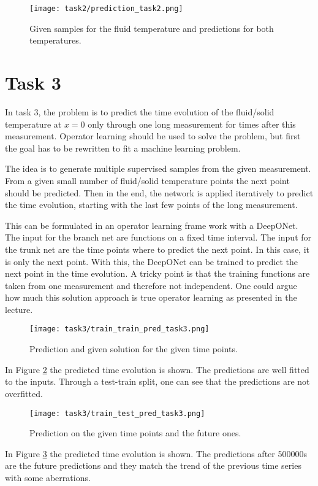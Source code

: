\documentclass{article}
\begin{document}
\begin{figure}[ht!]
\texttt{[image: task2/prediction\_task2.png]}
\caption{Given samples for the fluid temperature and predictions for both temperatures.}
\label{fig:task2_predictions}
\end{figure}

\section{Task 3}
In task 3, the problem is to predict the time evolution of the fluid/solid temperature at $x=0$
only through one long measurement for times after this measurement.
Operator learning should be used to solve the problem,
but first the goal has to be rewritten to fit a machine learning problem.

The idea is to generate multiple supervised samples from the given measurement.
From a given small number of fluid/solid temperature points the next point should be predicted.
Then in the end, the network is applied iteratively to predict the time evolution,
starting with the last few points of the long measurement.

This can be formulated in an operator learning frame work with a DeepONet.
The input for the branch net are functions on a fixed time interval.
The input for the trunk net are the time points where to predict the next point. In this case, it is only the next point.
With this, the DeepONet can be trained to predict the next point in the time evolution.
A tricky point is that the training functions are taken from one measurement
and therefore not independent. One could argue how much this solution approach is true operator learning as presented in the lecture.

\begin{figure}[ht!]
\texttt{[image: task3/train\_train\_pred\_task3.png]}
\caption{Prediction and given solution for the given time points.}
\label{fig:task4_predt}
\end{figure}


In Figure \ref{fig:task4_predt} the predicted time evolution is shown.
The predictions are well fitted to the inputs.
Through a test-train split, one can see that the predictions are not overfitted.

\begin{figure}[ht!]
\texttt{[image: task3/train\_test\_pred\_task3.png]}
\caption{Prediction on the given time points and the future ones.}
\label{fig:task4_pred}
\end{figure}

In Figure \ref{fig:task4_pred} the predicted time evolution is shown.
The predictions after 500000s are the future predictions 
and they match the trend of the previous time series with some aberrations.
\end{document}
